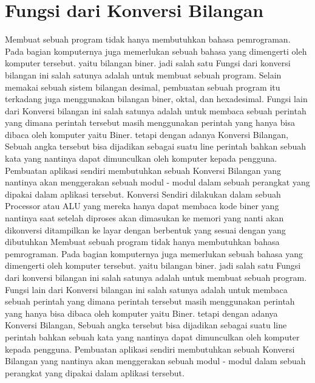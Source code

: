 \section{Fungsi dari Konversi Bilangan}
Membuat sebuah program tidak hanya membutuhkan bahasa pemrograman. Pada bagian komputernya juga memerlukan sebuah bahasa yang dimengerti oleh komputer tersebut. yaitu bilangan biner. jadi salah satu Fungsi dari konversi bilangan ini salah satunya adalah untuk membuat sebuah program. Selain memakai sebuah sistem bilangan desimal, pembuatan sebuah program itu terkadang juga menggunakan bilangan biner, oktal, dan hexadesimal.
Fungsi lain dari Konversi bilangan ini salah satunya adalah untuk membaca sebuah perintah yang dimana perintah tersebut masih menggunakan perintah yang hanya bisa dibaca oleh komputer yaitu Biner. tetapi dengan adanya Konversi Bilangan, Sebuah angka tersebut bisa dijadikan sebagai suatu line perintah bahkan sebuah kata yang nantinya dapat dimunculkan oleh komputer kepada pengguna. Pembuatan aplikasi sendiri membutuhkan sebuah Konversi Bilangan yang nantinya akan menggerakan sebuah modul - modul dalam sebuah perangkat yang dipakai dalam aplikasi tersebut. 
Konversi Sendiri dilakukan dalam sebuah Processor atau ALU yang mereka hanya dapat membaca kode biner yang nantinya saat setelah diproses akan dimasukan ke memori yang nanti akan dikonversi ditampilkan ke layar dengan berbentuk yang sesuai dengan yang dibutuhkan \cite{noersasongko1996mengrnal}
\break Membuat sebuah program tidak hanya membutuhkan bahasa pemrograman. Pada bagian komputernya juga memerlukan sebuah bahasa yang dimengerti oleh komputer tersebut. yaitu bilangan biner. jadi salah satu Fungsi dari konversi bilangan ini salah satunya adalah untuk membuat sebuah program. 
\break Fungsi lain dari Konversi bilangan ini salah satunya adalah untuk membaca sebuah perintah yang dimana perintah tersebut masih menggunakan perintah yang hanya bisa dibaca oleh komputer yaitu Biner. tetapi dengan adanya Konversi Bilangan, Sebuah angka tersebut bisa dijadikan sebagai suatu line perintah bahkan sebuah kata yang nantinya dapat dimunculkan oleh komputer kepada pengguna. Pembuatan aplikasi sendiri membutuhkan sebuah Konversi Bilangan yang nantinya akan menggerakan sebuah modul - modul dalam sebuah perangkat yang dipakai dalam aplikasi tersebut. 

